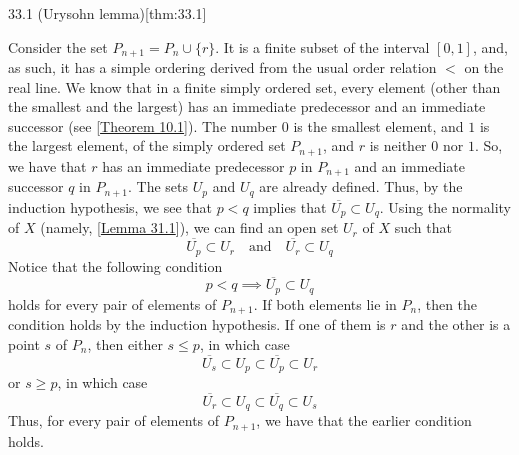 \begin{thmBox}{33.1 (Urysohn lemma)}[thm:33.1]
\begin{proofBox}
        Consider the set \( P_{ n + 1 } = P_{ n } \cup \{ r \} \).
        It is a finite subset of the interval \( [ 0, 1 ] \), and, as such, it has a 
        simple ordering derived from the usual order relation \( < \) on the real line.
        We know that in a finite simply ordered set, every element (other than the 
        smallest and the largest) has an immediate predecessor and an immediate 
        successor (see [\hyperlink{thm:10.1}{Theorem 10.1}]). 
        The number \( 0 \) is the smallest element, and \( 1 \) is the largest element, 
        of the simply ordered set \( P_{ n + 1 } \), and \( r \) is neither \( 0 \) nor 
        \( 1 \).
        So, we have that \( r \) has an immediate predecessor \( p \) in 
        \( P_{ n + 1 } \) and an immediate successor \( q \) in \( P_{ n + 1 } \).
        The sets \( U_{ p } \) and \( U_{ q } \) are already defined.
        Thus, by the induction hypothesis, we see that \( p < q \) implies that
        \( \overline{ U_{ p } } \subset U_{ q } \).
        Using the normality of \( X \) (namely, [\hyperlink{lem:31.1}{Lemma 31.1}]), 
        we can find an open set \( U_{ r } \) of \( X \) such that
        \begin{equation*}
            \overline{ U_{ p } } \subset U_{ r } 
            \quad \mathrm{and} \quad 
            \overline{ U_{ r } } \subset U_{ q }
        \end{equation*}
        Notice that the following condition 
        \begin{equation*}
            p < q
            \implies 
            \overline{ U_{ p } } \subset U_{ q }
        \end{equation*}
        holds for every pair of elements of \( P_{ n + 1 } \).
        If both elements lie in \( P_{ n } \), then the condition holds by the 
        induction hypothesis.
        If one of them is \( r \) and the other is a point \( s \) of \( P_{ n } \),
        then either \( s \leq p \), in which case
        \begin{equation*}
            \overline{ U_{ s } } \subset U_{ p } \subset \overline{ U_{ p } }
            \subset 
            U_{ r }
        \end{equation*}
        or \( s \geq p \), in which case
        \begin{equation*}
            \overline{ U_{ r } } \subset U_{ q } \subset \overline{ U_{ q } }
            \subset 
            U_{ s }
        \end{equation*}
        Thus, for every pair of elements of \( P_{ n + 1 } \), we have that the 
        earlier condition holds.


\end{proofBox}
\end{thmBox}
